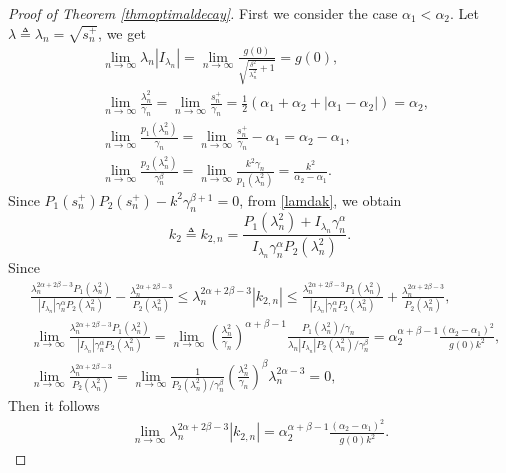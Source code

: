 \documentclass[12pt,reqno]{article}
\begin{document}
\begin{proof}[Proof of Theorem \ref{thmoptimaldecay}]
First we consider the case $\alpha_1<\alpha_2. $
Let $\lambda\triangleq\lambda_n=\sqrt{s_n^+}$, we get
\begin{align*}
	&\lim_{n\to\infty}\lambda_n|I_{\lambda_n}|=\lim_{n\to\infty}\frac{g(0)}{\sqrt{\frac{\delta^2}{\lambda_n^2}+1}}=g(0),\\
	&\lim_{n\to\infty}\frac{\lambda_n^2}{\gamma_n}=\lim_{n\to\infty}\frac{s_n^+}{\gamma_n}=\frac12\left(\alpha_1+\alpha_2+|\alpha_1-\alpha_2|\right)=\alpha_2,\\
	&\lim_{n\to\infty}\frac{p_1(\lambda_n^2)}{\gamma_n}=\lim_{n\to\infty}\frac{s_n^+}{\gamma_n}-\alpha_1=\alpha_2-\alpha_1,\\
	&\lim_{n\to\infty}\frac{p_2(\lambda_n^2)}{\gamma_n^\beta}=\lim_{n\to\infty}\frac{k^2\gamma_n}{p_1(\lambda_n^2)}=\frac{k^2}{\alpha_2-\alpha_1}.
\end{align*}
Since $P_1(s_n^+)P_2(s_n^+) - k^2 \gamma_n^{\beta+1}=0$,  from \eqref{lamdak}, we obtain
\begin{equation}\label{k2n}
	k_2\triangleq k_{2,n} = \frac{P_1(\lambda_n^2) + I_{\lambda_n} \gamma_n^\alpha}{ I_{\lambda_n} \gamma_n^\alpha P_2(\lambda_n^2) }.
\end{equation}
Since
\begin{align*}
	&\frac{\lambda_n^{2\alpha+2\beta-3}P_1(\lambda_n^2)}{ |I_{\lambda_n}| \gamma_n^\alpha P_2(\lambda_n^2) }-\frac{\lambda_n^{2\alpha+2\beta-3}}{P_2(\lambda_n^2) }\le\lambda_n^{2\alpha+2\beta-3}|k_{2,n}|\le\frac{\lambda_n^{2\alpha+2\beta-3}P_1(\lambda_n^2)}{ |I_{\lambda_n}| \gamma_n^\alpha P_2(\lambda_n^2) }+\frac{\lambda_n^{2\alpha+2\beta-3}}{P_2(\lambda_n^2) },\\
	&\lim_{n\to\infty}\frac{\lambda_n^{2\alpha+2\beta-3}P_1(\lambda_n^2)}{ |I_{\lambda_n}| \gamma_n^\alpha P_2(\lambda_n^2) }=\lim_{n\to\infty}\left(\frac{\lambda_n^2}{\gamma_n}\right)^{\alpha+\beta-1}\frac{P_1(\lambda_n^2)/\gamma_n}{\lambda_n|I_{\lambda_n}|P_2(\lambda_n^2)/\gamma_n^\beta}=\alpha_2^{\alpha+\beta-1}\frac{(\alpha_2-\alpha_1)^2}{g(0)k^2},\\
	&\lim_{n\to\infty}\frac{\lambda_n^{2\alpha+2\beta-3}}{P_2(\lambda_n^2)}=\lim_{n\to\infty}\frac{1}{P_2(\lambda_n^2)/\gamma_n^\beta}\left(\frac{\lambda_n^2}{\gamma_n}\right)^\beta\lambda_n^{2\alpha-3}=0,
\end{align*}
Then it follows
\begin{align*}
	\lim_{n\to\infty}\lambda_n^{2\alpha+2\beta-3}|k_{2,n}|=\alpha_2^{\alpha+\beta-1}\frac{(\alpha_2-\alpha_1)^2}{g(0)k^2}.
\end{align*}


\end{proof}
\end{document}
